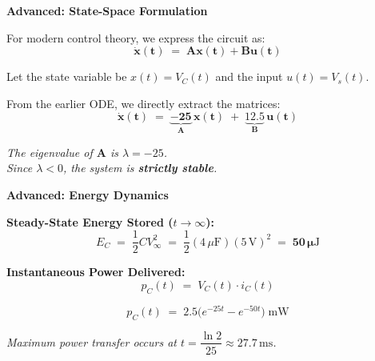 \documentclass[12pt]{beamer}
\begin{document}
\begin{frame}{\textbf{Advanced: State-Space Formulation}}
  \begin{center}
    \vfill
    For modern control theory, we express the circuit as:
    \[
      \mathbf{\dot{x}(t) \;=\; Ax(t) + Bu(t)}
    \]

    \vspace{1.5em}
    Let the state variable be $x(t) = V_C(t)$ and the input $u(t) = V_s(t)$.

    \vspace{1.5em}
    From the earlier ODE, we directly extract the matrices:
    \[
      \mathbf{\dot{x}(t) \;=\;
        \underbrace{-25}_{\mathbf{A}} \, x(t) \;+\;
        \underbrace{12.5}_{\mathbf{B}} \, u(t)}
    \]

    \vspace{1.5em}
    \normalsize
    \textit{The eigenvalue of $\mathbf{A}$ is $\lambda = -25$.\\
    Since $\lambda < 0$, the system is \textbf{strictly stable}.}
    \vfill
  \end{center}
\end{frame}

\begin{frame}{\textbf{Advanced: Energy Dynamics}}
  \begin{center}
    \vfill
    \textbf{Steady-State Energy Stored ($t \to \infty$):}
    \[
      E_C \;=\; \frac{1}{2} C V_\infty^2
           \;=\; \frac{1}{2} (4\,\mu\mathrm{F})(5\,\mathrm{V})^2
           \;=\; \mathbf{50\,\mu\mathrm{J}}
    \]

    \vspace{2em}
    \textbf{Instantaneous Power Delivered:}
    \[
      p_C(t) \;=\; V_C(t) \cdot i_C(t)
    \]

    \vspace{1em}
    \[
      p_C(t) \;=\; 2.5\bigl(e^{-25t} - e^{-50t}\bigr)\;\mathrm{mW}
    \]

    \vspace{1.5em}
    \normalsize
    \textit{Maximum power transfer occurs at
    $t = \dfrac{\ln 2}{25} \approx \mathbf{27.7\,\mathrm{ms}}$.}
    \vfill
  \end{center}
\end{frame}

\end{document}
